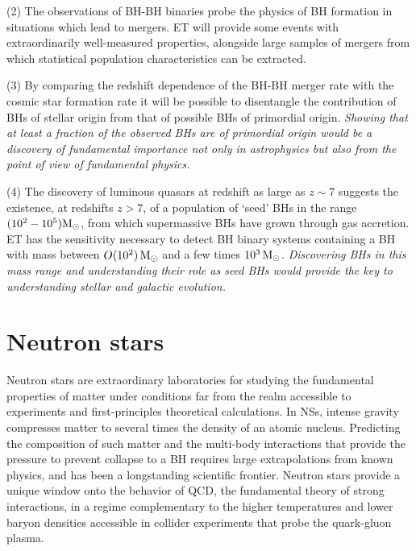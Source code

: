 (2) The observations of BH-BH binaries probe the physics of BH formation in situations which lead to mergers.  ET will provide some events with extraordinarily well-measured properties, alongside large samples of mergers from which statistical population characteristics can be extracted.   
   
(3) By comparing the redshift dependence of the BH-BH merger rate with the cosmic star formation rate it will be possible  to disentangle the contribution of BHs of stellar origin from that of  possible BHs of  primordial origin. 
\emph{Showing that at least a fraction of the observed BHs are of primordial origin would be a discovery of fundamental importance not only in astrophysics but also from the point of view of fundamental physics. }

(4) The discovery of luminous quasars at redshift as large as $z\sim 7$ suggests
the existence, at redshifts $z>7$, of a population of `seed' BHs in the range
$(10^2-10^5) \mathrm{M}_{\odot}$, from which supermassive BHs have grown through gas
accretion.   ET has the sensitivity necessary to detect  BH binary systems
containing  a  BH with mass between  $O(10^2)\,   \mathrm{M}_{\odot}$ and  a few times
$10^3\,\mathrm{M}_{\odot}$. \emph{Discovering BHs in this mass range and understanding their role as seed BHs would provide the key to understanding stellar and galactic evolution.}

   
\section{Neutron stars} 

Neutron stars  are extraordinary laboratories for studying the fundamental properties of matter under conditions far from the realm accessible to experiments and first-principles theoretical calculations. In NSs, intense gravity compresses matter to several times the density of an atomic nucleus. Predicting the composition of such matter and the multi-body interactions that provide the pressure to prevent collapse to a BH requires large extrapolations from known physics, and has been a longstanding scientific frontier.   Neutron stars  provide a unique window onto the behavior of QCD, the fundamental theory of strong interactions, in a regime complementary to the higher temperatures and lower baryon densities accessible in collider experiments that probe the quark-gluon plasma. 


